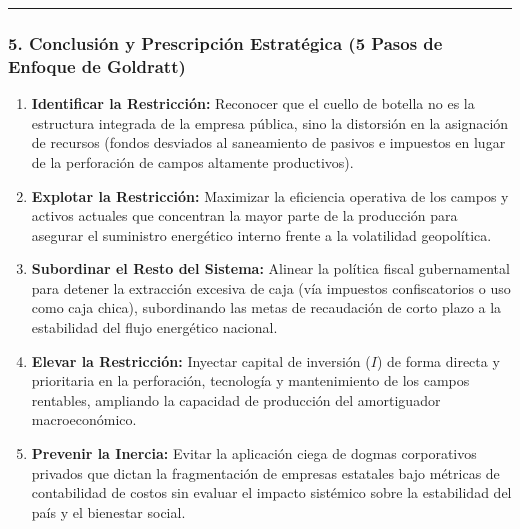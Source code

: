 \documentclass[12pt,letterpaper]{article}
\providecommand{\tightlist}{%
  \setlength{\itemsep}{0pt}\setlength{\parskip}{0pt}}
\begin{document}
\begin{center}\rule{0.5\linewidth}{0.5pt}\end{center}

\hypertarget{conclusiuxf3n-y-prescripciuxf3n-estratuxe9gica-5-pasos-de-enfoque-de-goldratt}{%
\subsubsection{5. Conclusión y Prescripción Estratégica (5 Pasos de
Enfoque de
Goldratt)}\label{conclusiuxf3n-y-prescripciuxf3n-estratuxe9gica-5-pasos-de-enfoque-de-goldratt}}

\begin{enumerate}
\def\labelenumi{\arabic{enumi}.}
\tightlist
\item
  \textbf{Identificar la Restricción:} Reconocer que el cuello de
  botella no es la estructura integrada de la empresa pública, sino la
  distorsión en la asignación de recursos (fondos desviados al
  saneamiento de pasivos e impuestos en lugar de la perforación de
  campos altamente productivos).
\item
  \textbf{Explotar la Restricción:} Maximizar la eficiencia operativa de
  los campos y activos actuales que concentran la mayor parte de la
  producción para asegurar el suministro energético interno frente a la
  volatilidad geopolítica.
\item
  \textbf{Subordinar el Resto del Sistema:} Alinear la política fiscal
  gubernamental para detener la extracción excesiva de caja (vía
  impuestos confiscatorios o uso como caja chica), subordinando las
  metas de recaudación de corto plazo a la estabilidad del flujo
  energético nacional.
\item
  \textbf{Elevar la Restricción:} Inyectar capital de inversión (\(I\))
  de forma directa y prioritaria en la perforación, tecnología y
  mantenimiento de los campos rentables, ampliando la capacidad de
  producción del amortiguador macroeconómico.
\item
  \textbf{Prevenir la Inercia:} Evitar la aplicación ciega de dogmas
  corporativos privados que dictan la fragmentación de empresas
  estatales bajo métricas de contabilidad de costos sin evaluar el
  impacto sistémico sobre la estabilidad del país y el bienestar social.
\end{enumerate}
\end{document}
